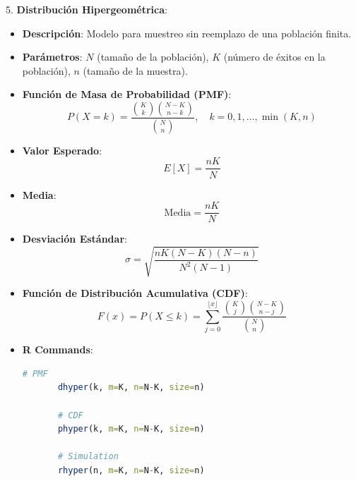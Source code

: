 \documentclass{article}
\begin{document}
5. \textbf{{ \Large Distribución Hipergeométrica}}:
   \begin{itemize}
       \item \textbf{Descripción}: Modelo para muestreo sin reemplazo de una población finita.
       \item \textbf{Parámetros}: \( N \) (tamaño de la población), \( K \) (número de éxitos en la población), \( n \) (tamaño de la muestra).
       \item \textbf{Función de Masa de Probabilidad (PMF)}:
       \[
       P(X=k) = \frac{\binom{K}{k} \binom{N-K}{n-k}}{\binom{N}{n}}, \quad k = 0, 1, \ldots, \min(K, n)
       \]
       \item \textbf{Valor Esperado}:
       \[
       E[X] = \frac{nK}{N}
       \]
       \item \textbf{Media}:
       \[
       \text{Media} = \frac{nK}{N}
       \]
       \item \textbf{Desviación Estándar}:
       \[
       \sigma = \sqrt{\frac{nK(N-K)(N-n)}{N^2(N-1)}}
       \]
       \item \textbf{Función de Distribución Acumulativa (CDF)}:
       \[
       F(x) = P(X \leq k) = \sum_{j=0}^{\lfloor x \rfloor} \frac{\binom{K}{j} \binom{N-K}{n-j}}{\binom{N}{n}}
       \]
       \item \textbf{R Commands}:
       \begin{lstlisting}[style=colored, language=R]
       # PMF
       dhyper(k, m=K, n=N-K, size=n)
       
       # CDF
       phyper(k, m=K, n=N-K, size=n)
       
       # Simulation
       rhyper(n, m=K, n=N-K, size=n)
       \end{lstlisting}
   \end{itemize}
\end{document}
